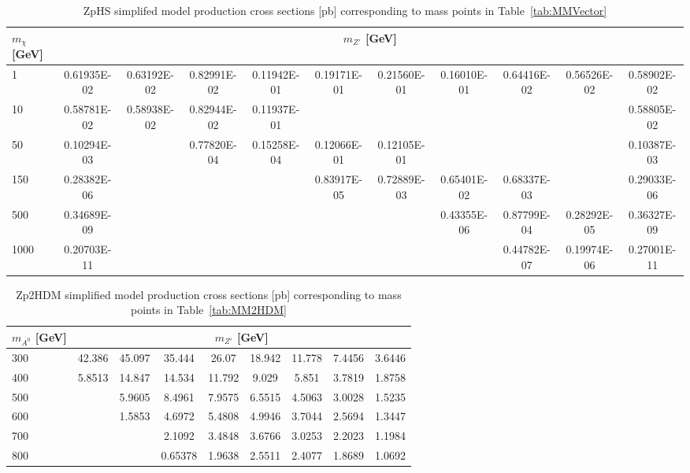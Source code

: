 \begin{sidewaystable*}[htbH]
\begin{adjustbox}{width=\textwidth,totalheight=\textheight,keepaspectratio}
\label{tab:zphsxsecs}
\begin{tabular}{l | c | c | c | c | c | c | c | c | c | c}
\hline 
$m_\chi$ [GeV] & \multicolumn{10}{c}{$m_{Z'}$ [GeV]} \\ 
\hline
1 & 0.61935E-02 & 0.63192E-02 & 0.82991E-02 & 0.11942E-01 & 0.19171E-01 & 0.21560E-01 & 0.16010E-01 & 0.64416E-02 & 0.56526E-02 & 0.58902E-02 \\
10 & 0.58781E-02 & 0.58938E-02 & 0.82944E-02 & 0.11937E-01 & & & & & & 0.58805E-02\\
50 & 0.10294E-03 & & 0.77820E-04 & 0.15258E-04  & 0.12066E-01 & 0.12105E-01 & & & & 0.10387E-03 \\
150 & 0.28382E-06 & & & & 0.83917E-05 & 0.72889E-03 & 0.65401E-02 & 0.68337E-03 & & 0.29033E-06 \\
500 & 0.34689E-09 & & & & & & 0.43355E-06 & 0.87799E-04 & 0.28292E-05 & 0.36327E-09 \\
1000 & 0.20703E-11 & & & & & & & 0.44782E-07 & 0.19974E-06 & 0.27001E-11 \\
\hline
\end{tabular}
\end{adjustbox}
\caption{ZpHS simplifed model production cross sections [pb] corresponding to mass points in Table~\ref{tab:MMVector}}
\end{sidewaystable*}

\begin{sidewaystable*}[htbH]
\begin{center}
\begin{tabular}{l | c | c | c | c | c | c | c | c }
\hline 
$m_{A^0}$ [GeV] & \multicolumn{8}{c}{$m_{Z'}$ [GeV]} \\ 
\hline
300 & 42.386 & 45.097 & 35.444 & 26.07 & 18.942 & 11.778 & 7.4456 & 3.6446 \\  
400 & 5.8513 & 14.847 & 14.534 & 11.792 & 9.029 & 5.851 & 3.7819 & 1.8758 \\  
500 & & 5.9605 & 8.4961 & 7.9575 & 6.5515 & 4.5063 & 3.0028 & 1.5235 \\  
600 & & 1.5853 & 4.6972 & 5.4808 & 4.9946 & 3.7044 & 2.5694 & 1.3447 \\
700 & & & 2.1092 & 3.4848 & 3.6766 & 3.0253 & 2.2023 & 1.1984 \\  
800 & & & 0.65378 & 1.9638 & 2.5511 & 2.4077 & 1.8689 & 1.0692 \\  
\hline
\end{tabular}
\caption{Zp2HDM simplified model production cross sections [pb] corresponding to mass points in Table~\ref{tab:MM2HDM} \label{tab:zp2hdmxsecs}}
\end{center}
\end{sidewaystable*}
